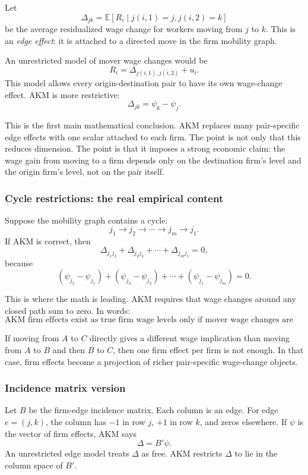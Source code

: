 \documentclass[11pt]{article}
\newcommand{\E}{\mathbb{E}}
\newcommand{\1}{\mathbf{1}}
\begin{document}
Let
\[
\Delta_{jk}
=
\E[R_i\mid j(i,1)=j,j(i,2)=k]
\]
be the average residualized wage change for workers moving from $j$ to $k$. This is an \emph{edge effect}: it is attached to a directed move in the firm mobility graph.

An unrestricted model of mover wage changes would be
\[
R_i
=
\Delta_{j(i,1),j(i,2)}+u_i.
\]
This model allows every origin-destination pair to have its own wage-change effect. AKM is more restrictive:
\[
\boxed{
\Delta_{jk}=\psi_k-\psi_j.
}
\]

This is the first main mathematical conclusion. AKM replaces many pair-specific edge effects with one scalar attached to each firm. The point is not only that this reduces dimension. The point is that it imposes a strong economic claim: the wage gain from moving to a firm depends only on the destination firm's level and the origin firm's level, not on the pair itself.

\subsubsection*{Cycle restrictions: the real empirical content}

Suppose the mobility graph contains a cycle:
\[
j_1\to j_2\to \cdots \to j_m\to j_1.
\]
If AKM is correct, then
\[
\Delta_{j_1j_2}+\Delta_{j_2j_3}+\cdots+\Delta_{j_mj_1}
=0,
\]
because
\[
(\psi_{j_2}-\psi_{j_1})
+(\psi_{j_3}-\psi_{j_2})
+\cdots
+(\psi_{j_1}-\psi_{j_m})
=0.
\]

This is where the math is leading. AKM requires that wage changes around any closed path sum to zero. In words:
\[
\boxed{
\text{AKM firm effects exist as true firm wage levels only if mover wage changes are path independent.}
}
\]

If moving from $A$ to $C$ directly gives a different wage implication than moving from $A$ to $B$ and then $B$ to $C$, then one firm effect per firm is not enough. In that case, firm effects become a projection of richer pair-specific wage-change objects.

\subsubsection*{Incidence matrix version}

Let $B$ be the firm-edge incidence matrix. Each column is an edge. For edge $e=(j,k)$, the column has $-1$ in row $j$, $+1$ in row $k$, and zeros elsewhere. If $\psi$ is the vector of firm effects, AKM says
\[
\Delta = B'\psi.
\]
An unrestricted edge model treats $\Delta$ as free. AKM restricts $\Delta$ to lie in the column space of $B'$.
\end{document}

